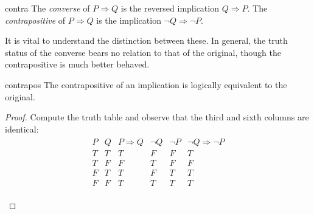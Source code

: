 \goodbreak



\begin{defn}{}{contra}
	The \emph{converse} of $P\Longrightarrow Q$ is the reversed implication $Q\Longrightarrow P$.\smallbreak
	The \emph{contrapositive} of $P\Longrightarrow Q$ is the implication $\neg Q\Longrightarrow\neg P$.
\end{defn}

It is vital to understand the distinction between these. In general, the truth status of the converse bears no relation to that of the original, though the contrapositive is much better behaved.

\begin{thm}{}{contrapos}
	The contrapositive of an implication is logically equivalent to the original.
\end{thm}

\begin{proof}
	Compute the truth table and observe that the third and sixth columns are identical:\footnotemark
	\begin{gather*}
		\begin{array}{cc|c||cc|c}
			P & Q & P\Longrightarrow Q & \neg Q & \neg P & \neg Q\Longrightarrow\neg P\\\hline
			T & T & T & F & F & T\\
			T & F & F & T & F & F\\
			F & T & T & F & T & T\\
			F & F & T & T & T & T
		\end{array}\\[-15pt]
		\phantom{bob}\tag*{\qedhere}
	\end{gather*}
\end{proof}


\vspace{-5pt}


